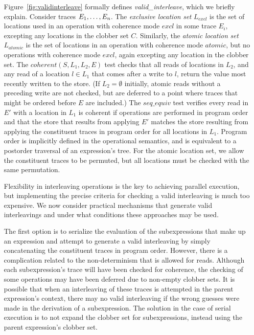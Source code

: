 Figure~\ref{fig:validinterleave} formally defines {\em
valid\_interleave}, which we briefly explain.  Consider
traces ${E}_1,\ldots,{E}_n$.  The {\em exclusive location set} $L_{excl}$ is the
set of locations used in an operation with coherence mode $excl$ in
some trace $E_i$, excepting any locations in the clobber set $C$.
Similarly, the {\em atomic location set} $L_{atomic}$ is the set of
locations in an operation with coherence mode $atomic$, but no
operations with coherence mode $excl$, again excepting any location in
the clobber set.  The $coherent(S,L_1,L_2,E)$ test checks that all
reads of locations in $L_2$, and any read of a location $l \in L_1$
that comes after a write to $l$, return the value most recently written
to the store.  (If $L_2 = \emptyset$ initially, atomic reads without a preceding write are not 
checked, but are deferred to a point where traces that might be ordered before $E$ are included.)  The $seq\_equiv$
test verifies every read in $E'$ with a location in $L_1$ 
is coherent if operations are performed in 
program order and that the store that results from applying $E'$
matches the store resulting from applying the
constituent traces in program order for all locations in $L_1$.  Program order
is implicitly defined in the operational semantics, and is equivalent to a 
postorder traversal of an expression's tree.  For
the atomic location set, we allow the constituent traces to be
permuted, but all locations must be checked with the same permutation.

Flexibility in interleaving operations is the key to achieving parallel execution, but
implementing the precise criteria for checking a valid interleaving is
much too expensive.  We now consider practical mechanisms that generate valid interleavings and 
under what conditions these approaches may be used.

The first option is to serialize the evaluation of the subexpressions that
make up an expression and attempt to generate a valid interleaving by simply
concatenating the constituent traces in program order.  However, there is a
complication related to the non-determinism that is allowed for reads.  Although
each subexpression's trace will have been checked for coherence, the checking
of some operations may have been deferred due to non-empty
clobber sets.  It is possible that when an interleaving of these traces
is attempted in the parent expression's context, there may no valid interleaving
if the wrong guesses were made in the derivation of a subexpression.
The solution in the case of serial execution is to not expand the clobber
set for subexpressions, instead using the parent expression's clobber set.


